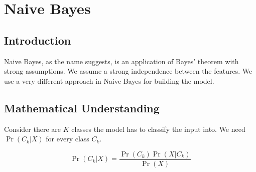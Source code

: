 
\chapter{Naive Bayes}
\label{chp:bayes}

\section{Introduction}
Naive Bayes, as the name suggests, is an application of Bayes' theorem with strong assumptions.
We assume a strong independence between the features. We use a very different approach
in Naive Bayes for building the model.

\section{Mathematical Understanding}
Consider there are $K$ classes the model has to classify the input into.
We need $\Pr{(C_k | X)}$ for every class $C_k$.

\begin{equation}
    \Pr (C_k | X) = \frac{\Pr (C_k) \Pr (X|C_k)}{\Pr (X)}
\end{equation}